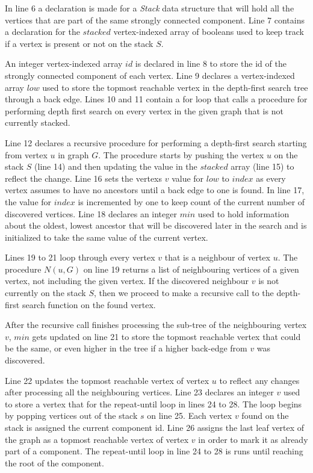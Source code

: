 \documentclass{l4proj}
\begin{document}
\noindent In line 6 a declaration is made for a \textit{Stack} data structure that will hold all the vertices that are part of the same strongly connected component. Line 7 contains a declaration for the $stacked$ vertex-indexed array of booleans used to keep track if a vertex is present or not on the stack $S$.

\noindent An integer vertex-indexed array $id$ is declared in line 8 to store the id of the strongly connected component of each vertex. Line 9 declares a vertex-indexed array $low$ used to store the topmost reachable vertex in the depth-first search tree through a back edge. Lines 10 and 11 contain a for loop that calls a procedure for performing depth first search on every vertex in the given graph that is not currently stacked.

\noindent Line 12 declares a recursive procedure for performing a depth-first search starting from vertex $u$ in graph $G$. The procedure starts by pushing the vertex $u$ on the stack $S$ (line 14) and then updating the value in the $stacked$ array (line 15) to reflect the change. Line 16 sets the vertex\textquotesingle s $v$ value for $low$ to $index$ as every vertex assumes to have no ancestors until a back edge to one is found. In line 17, the value for $index$ is incremented by one to keep count of the current number of discovered vertices. Line 18 declares an integer $min$ used to hold information about the oldest, lowest ancestor that will be discovered later in the search and is initialized to take the same value of the current vertex.

\noindent Lines 19 to 21 loop through every vertex $v$ that is a neighbour of vertex $u$. The procedure $N(u, G)$ on line 19 returns a list of neighbouring vertices of a given vertex, not including the given vertex. If the discovered neighbour $v$ is not currently on the stack $S$, then we proceed to make a recursive call to the depth-first search function on the found vertex.

\noindent After the recursive call finishes processing the sub-tree of the neighbouring vertex $v$, $min$ gets updated on line 21 to store the topmost reachable vertex that could be the same, or even higher in the tree if a higher back-edge from $v$ was discovered.

\noindent Line 22 updates the topmost reachable vertex of vertex $u$ to reflect any changes after processing all the neighbouring vertices. Line 23 declares an integer $v$ used to store a vertex that for the repeat-until loop in lines 24 to 28. The loop begins by popping vertices out of the stack $s$ on line 25. Each vertex $v$ found on the stack is assigned the current component id. Line 26 assigns the last leaf vertex of the graph as a topmost reachable vertex of vertex $v$ in order to mark it as already part of a component. The repeat-until loop in line 24 to 28 is runs until reaching the root of the component.
\end{document}
